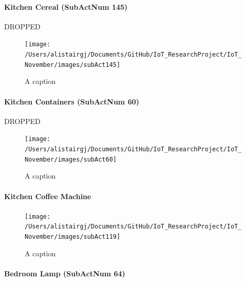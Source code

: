 \documentclass[11pt,]{article}
\let\oldparagraph\paragraph
\renewcommand{\paragraph}[1]{\oldparagraph{#1}\mbox{}}
\begin{document}
\hypertarget{kitchen-cereal-subactnum-145}{%
\paragraph{Kitchen Cereal (SubActNum
145)}\label{kitchen-cereal-subactnum-145}}

DROPPED

\begin{figure}[H]

{\centering \texttt{[image: /Users/alistairgj/Documents/GitHub/IoT\_ResearchProject/IoT\_November/images/subAct145]} 

}

\caption{A caption}\label{fig:subAct145}
\end{figure}

\hypertarget{kitchen-containers-subactnum-60}{%
\paragraph{Kitchen Containers (SubActNum
60)}\label{kitchen-containers-subactnum-60}}

DROPPED

\begin{figure}[H]

{\centering \texttt{[image: /Users/alistairgj/Documents/GitHub/IoT\_ResearchProject/IoT\_November/images/subAct60]} 

}

\caption{A caption}\label{fig:subAct60}
\end{figure}

\hypertarget{kitchen-coffee-machine}{%
\paragraph{Kitchen Coffee Machine}\label{kitchen-coffee-machine}}

\begin{figure}[H]

{\centering \texttt{[image: /Users/alistairgj/Documents/GitHub/IoT\_ResearchProject/IoT\_November/images/subAct119]} 

}

\caption{A caption}\label{fig:subAct119}
\end{figure}

\hypertarget{bedroom-lamp-subactnum-64}{%
\paragraph{Bedroom Lamp (SubActNum
64)}\label{bedroom-lamp-subactnum-64}}
\end{document}
